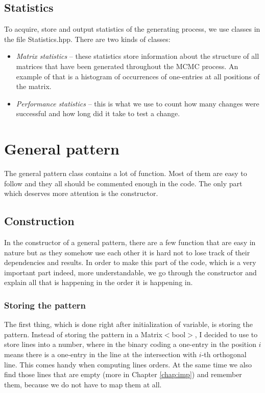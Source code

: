 \subsection{Statistics}
To acquire, store and output statistics of the generating process, we use classes in the file Statistics.hpp. There are two kinds of classes:
\begin{itemize}
\item \emph{Matrix statistics} -- these statistics store information about the structure of all matrices that have been generated throughout the MCMC process. An example of that is a histogram of occurrences of one-entries at all positions of the matrix.
\item \emph{Performance statistics} -- this is what we use to count how many changes were successful and how long did it take to test a change.
\end{itemize}

\section{General pattern}
The general pattern class contains a lot of function. Most of them are easy to follow and they all should be commented enough in the code. The only part which deserves more attention is the constructor.

\subsection{Construction}
In the constructor of a general pattern, there are a few function that are easy in nature but as they somehow use each other it is hard not to lose track of their dependencies and results. In order to make this part of the code, which is a very important part indeed, more understandable, we go through the constructor and explain all that is happening in the order it is happening in.

\subsubsection{Storing the pattern}
The first thing, which is done right after initialization of variable, is storing the pattern. Instead of storing the pattern in a Matrix$<$bool$>$, I decided to use to store lines into a number, where in the binary coding a one-entry in the position $i$ means there is a one-entry in the line at the intersection with $i$-th orthogonal line. This comes handy when computing lines orders. At the same time we also find those lines that are empty (more in Chapter \ref{chap:imp}) and remember them, because we do not have to map them at all.

